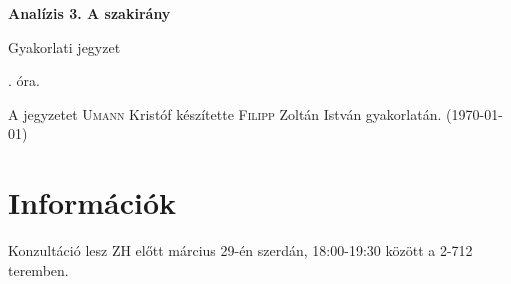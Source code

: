 \documentclass[a4paper,11.5pt]{article}
\begin{document}
	\setlength\parindent{0pt}
	\def\a{\textbf{a}}
	\def\b{\textbf{b}}
	\def\N{\hskip 10 true mm}
	\def\a{\textbf{a}}
	\def\b{\textbf{b}}
	\def\c{\textbf{c}}
	\def\d{\textbf{d}}
	\def\e{\textbf{e}}
	\def\gg{$\gamma$}
	\def\vi{\textbf{i}}
	\def\jj{\textbf{j}}
	\def\kk{\textbf{k}}
	\def\fh{\overrightarrow}
	\def\l{\lambda}
	\def\m{\mu}
	\def\v{\textbf{v}}
	\def\0{\textbf{0}}
	\def\s{\hspace{0.2mm}\vphantom{\beta}}
	\def\Z{\mathbb{Z}}
	\def\Q{\mathbb{Q}}
	\def\R{\mathbb{R}}
	\def\C{\mathbb{C}}
	\def\N{\mathbb{N}}
	\def\Rn{\mathbb{R}^{n}}
	\def\Ra{\overline{\mathbb{R}}}
	\def\sume{\displaystyle\sum_{n=1}^{+\infty}}
	\def\sumn{\displaystyle\sum_{n=0}^{+\infty}}
	\def\biz{\emph{Bizonyítás:\ }}
	\def\narrow{\underset{n\rightarrow+\infty}{\longrightarrow}}
	\def\limn{\displaystyle\lim_{n\to +\infty}}
	
	\theoremstyle{definition}
	\newtheorem{theorem}{Tétel}[subsection] %
	
	\theoremstyle{definition}
	\newtheorem{definition}[theorem]{Definíció} %
	\newtheorem{example}[theorem]{Példa} %
	\newtheorem{exercise}[theorem]{Házi feladat} %
	\newtheorem{note}[theorem]{Megjegyzés} %
	\newtheorem{task}[theorem]{Feladat} %
	\newtheorem{revision}[theorem]{Emlékeztető} %
	\begin{center}
		{\LARGE\textbf{Analízis 3. A szakirány}}
		\smallskip
		
		{\Large Gyakorlati jegyzet}
		
		. óra.
	\end{center}
	A jegyzetet \textsc{Umann} Kristóf készítette \textsc{Filipp} Zoltán István gyakorlatán. (\today)
	\section{Információk}
	Konzultáció lesz ZH előtt március 29-én szerdán, 18:00-19:30 között a 2-712 teremben.
\end{document}
